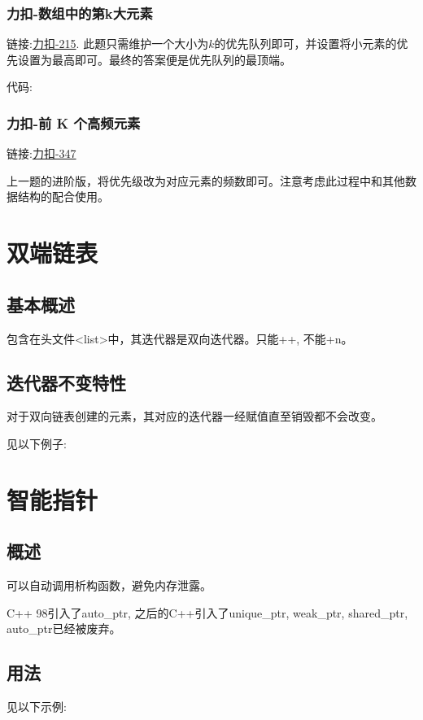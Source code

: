 \documentclass{article}
\begin{document}
    \subsubsection{力扣-数组中的第k大元素}
    链接:\href{https://leetcode.cn/problems/kth-largest-element-in-an-array/}{力扣-215}.
    此题只需维护一个大小为$k$的优先队列即可，并设置将小元素的优先设置为最高即可。最终的答案便是优先队列的最顶端。

    代码:
    

    \subsubsection{力扣-前 K 个高频元素}
    链接:\href{https://leetcode.cn/problems/top-k-frequent-elements/description/}{力扣-347}

    上一题的进阶版，将优先级改为对应元素的频数即可。注意考虑此过程中和其他数据结构的配合使用。
    

    \section{双端链表}
    
    \subsection{基本概述}
    包含在头文件<list>中，其迭代器是双向迭代器。只能++, 不能+n。

    \subsection{迭代器不变特性}
    对于双向链表创建的元素，其对应的迭代器一经赋值直至销毁都不会改变。

    见以下例子:
    

    \section{智能指针}
    \subsection{概述}
    可以自动调用析构函数，避免内存泄露。

    C++ 98引入了auto_ptr, 之后的C++引入了unique_ptr, weak_ptr, shared_ptr, auto_ptr已经被废弃。

    \subsection{用法}
    见以下示例:
\end{document}
